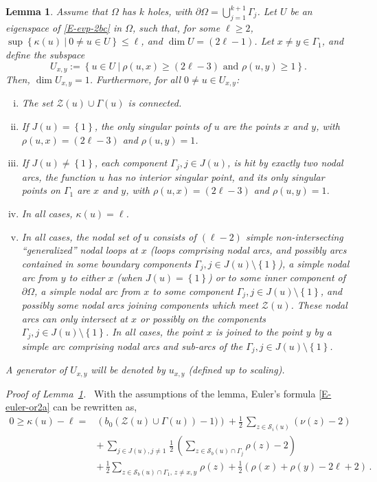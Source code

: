 \documentclass[12pt,a4paper]{amsart}
\theoremstyle{plain} %
\newtheorem{lemma}[theorem]{Lemma}
\theoremstyle{definition}
\numberwithin{equation}{section}
\numberwithin{figure}{section}
\numberwithin{table}{section}
\newcommand{\cS}{\mathcal{S}}
\newcommand{\cZ}{\mathcal{Z}}
\newcommand{\sm}{\!\setminus\!}
\newcommand{\set}[1]{\left\lbrace #1 \right\rbrace}
\begin{document}
{\begin{lemma}\label{L-Uxyk} Assume that $\Omega$ has $k$ holes, with $\partial \Omega = \bigcup_{j=1}^{k+1} \Gamma_j$.  Let $U$ be an eigenspace of \eqref{E-evp-2bc} in $\Omega$, such that, for some $\ell \ge 2$,  $\sup\set{\kappa(u) ~|~ 0 \not = u \in U}\le \ell$, and  $\dim U = (2\ell-1)$. Let $x \neq y \in \Gamma_1$, and define the subspace $$U_{x,y} := \set{u \in U ~|~ \rho(u,x) \ge (2\ell - 3) \text{~and~} \rho(u,y) \ge 1}.$$  Then, $\dim U_{x,y} = 1$. Furthermore, for all $0 \neq u \in U_{x,y}$:
\begin{enumerate}[(i)]
  \item The set $\cZ(u) \cup \Gamma(u)$ is connected.
  \item If $J(u)=\set{1}$, the only singular points of $u$ are the points $x$ and $y$, with $\rho(u,x) = (2\ell - 3)$ and $\rho(u,y)=1$.
  \item If $J(u) \not = \set{1}$, each component $\Gamma_j, j \in J(u)$, is hit by exactly two nodal arcs, the function $u$ has no interior singular point, and its only singular points on $\Gamma_1$ are $x$ and $y$, with $\rho(u,x) = (2\ell - 3)$ and $\rho(u,y)=1$.
  \item In all cases, $\kappa(u) = \ell$.
  \item In all cases, the nodal set of $u$ consists of $(\ell - 2)$ simple non-intersecting ``generalized'' nodal loops at $x$ (loops comprising nodal arcs, and possibly arcs contained in some boundary components $\Gamma_j, j \in J(u)\sm \set{1}$), a simple nodal arc from $y$ to either $x$ (when $J(u)=\set{1}$) or to some inner component of $\partial \Omega$, a simple nodal arc from $x$ to some component $\Gamma_j, j\in J(u)\sm \set{1}$, and possibly some nodal arcs joining components which meet $\cZ(u)$. These nodal arcs can only intersect at $x$ or possibly on the components $\Gamma_j, j \in J(u)\sm \set{1}$. In all cases, the point $x$ is joined to the point $y$ by a simple arc comprising nodal arcs and sub-arcs of the $\Gamma_j, j \in J(u)\sm \set{1}$.
\end{enumerate}
A generator of $U_{x,y}$ will be denoted by $u_{x,y}$ (defined up to scaling).
\end{lemma}%

\emph{Proof of Lemma~\ref{L-Uxyk}.}~  With the assumptions of the lemma, Euler's formula \eqref{E-euler-or2a}
can be rewritten as,
%
\begin{equation}\label{E-bha-k10}
\begin{array}{ll}
0 \ge \kappa(u) - \ell =& \left( b_0(\cZ(u) \cup \Gamma(u)) - 1) \right)
+ \frac 12\, \sum_{z \in \cS_i(u)} (\nu(z)-2)\\[5pt]
& +\, \sum_{j \in J(u), j\neq 1\,} \frac 12  \, \left( \sum_{z\in \cS _b(u) \cap \Gamma_j}\rho (z) - 2 \right)\\[5pt]
& +\, \frac 12 \sum_{z\in \cS _b(u) \cap \Gamma_1,\, z \not = x,y\,}\rho (z) + \frac 12 \left( \rho(x) + \rho(y) - 2\ell +2\right)\,.
\end{array}%
\end{equation}

}
\end{document}
